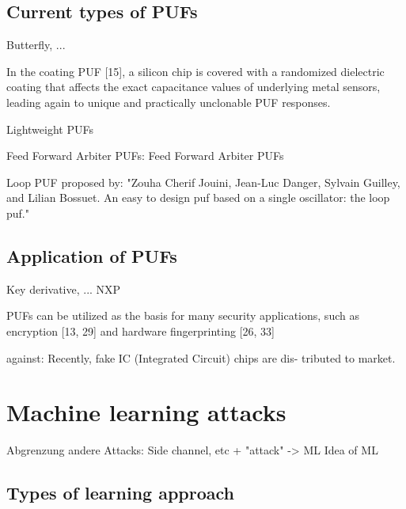 \cite{Becker2015ThePUFs}


\subsection{Current types of PUFs}

Butterfly, ...
\cite{Becker2015ThePUFs}

In the coating PUF [15], a silicon chip is covered with a randomized dielectric coating that affects the exact capacitance values of underlying metal sensors, leading again to unique and practically unclonable PUF responses. \cite{Armknecht2011AFunctions}

Lightweight PUFs \cite{Delvaux2014SecureImpossible}

Feed Forward Arbiter PUFs: Feed Forward Arbiter PUFs \cite{Ruhrmair2013PUFData}

Loop PUF proposed by: "Zouha Cherif Jouini, Jean-Luc Danger, Sylvain Guilley, and Lilian
Bossuet. An easy to design puf based on a single oscillator: the loop
puf."

\apufs


\subsection{Application of PUFs}

Key derivative, ...
\cite{Becker2015ThePUFs} NXP

PUFs can be utilized as the basis for many security applications, such as encryption [13, 29] and hardware fingerprinting [26, 33]
\cite{Tajik2014PhysicalPUFs}

against: Recently, fake IC (Integrated Circuit) chips are dis- tributed to market.
\cite{Machida2015ImplementationFPGA}


\section{Machine learning attacks}

Abgrenzung andere Attacks: Side channel, etc + "attack" -> ML
Idea of ML

\subsection{Types of learning approach}


